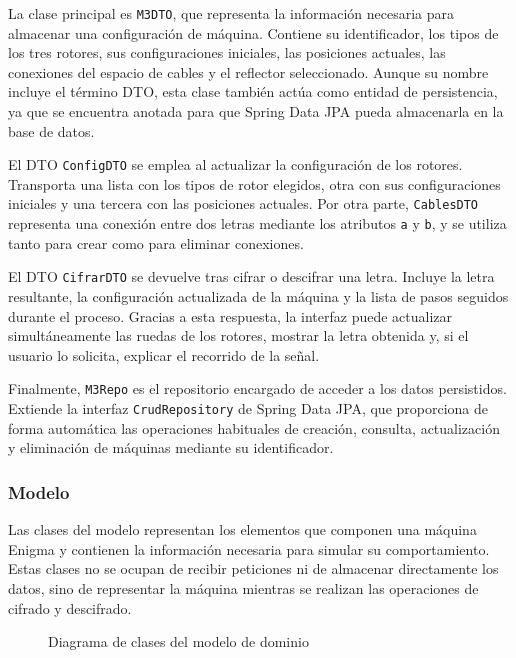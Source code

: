 La clase principal es \texttt{M3DTO}, que representa la información necesaria para almacenar una configuración de máquina. Contiene su identificador, los tipos de los tres rotores, sus configuraciones iniciales, las posiciones actuales, las conexiones del espacio de cables y el reflector seleccionado. Aunque su nombre incluye el término DTO, esta clase también actúa como entidad de persistencia, ya que se encuentra anotada para que Spring Data JPA pueda almacenarla en la base de datos.

El DTO \texttt{ConfigDTO} se emplea al actualizar la configuración de los rotores. Transporta una lista con los tipos de rotor elegidos, otra con sus configuraciones iniciales y una tercera con las posiciones actuales. Por otra parte, \texttt{CablesDTO} representa una conexión entre dos letras mediante los atributos \texttt{a} y \texttt{b}, y se utiliza tanto para crear como para eliminar conexiones.

El DTO \texttt{CifrarDTO} se devuelve tras cifrar o descifrar una letra. Incluye la letra resultante, la configuración actualizada de la máquina y la lista de pasos seguidos durante el proceso. Gracias a esta respuesta, la interfaz puede actualizar simultáneamente las ruedas de los rotores, mostrar la letra obtenida y, si el usuario lo solicita, explicar el recorrido de la señal.

Finalmente, \texttt{M3Repo} es el repositorio encargado de acceder a los datos persistidos. Extiende la interfaz \texttt{CrudRepository} de Spring Data JPA, que proporciona de forma automática las operaciones habituales de creación, consulta, actualización y eliminación de máquinas mediante su identificador.

\subsubsection{Modelo}

Las clases del modelo representan los elementos que componen una máquina Enigma y contienen la información necesaria para simular su comportamiento. Estas clases no se ocupan de recibir peticiones ni de almacenar directamente los datos, sino de representar la máquina mientras se realizan las operaciones de cifrado y descifrado.

\begin{figure}[htbp]
	\centerline{}
	\caption{Diagrama de clases del modelo de dominio}
	\label{clases_modelo}
\end{figure}

